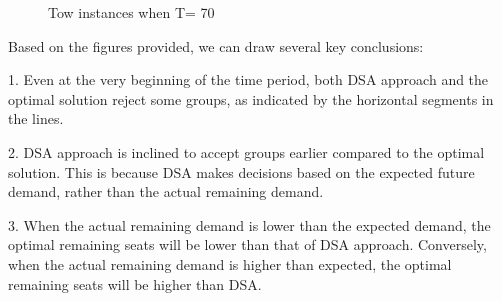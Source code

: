 \begin{figure}[h]
  \centering
  \caption{Tow instances when T= 70}
\end{figure}

Based on the figures provided, we can draw several key conclusions:

1. Even at the very beginning of the time period, both DSA approach and the optimal solution reject some groups, as indicated by the horizontal segments in the lines.

2. DSA approach is inclined to accept groups earlier compared to the optimal solution. This is because DSA makes decisions based on the expected future demand, rather than the actual remaining demand.

3. When the actual remaining demand is lower than the expected demand, the optimal remaining seats will be lower than that of DSA approach. Conversely, when the actual remaining demand is higher than expected, the optimal remaining seats will be higher than DSA.

